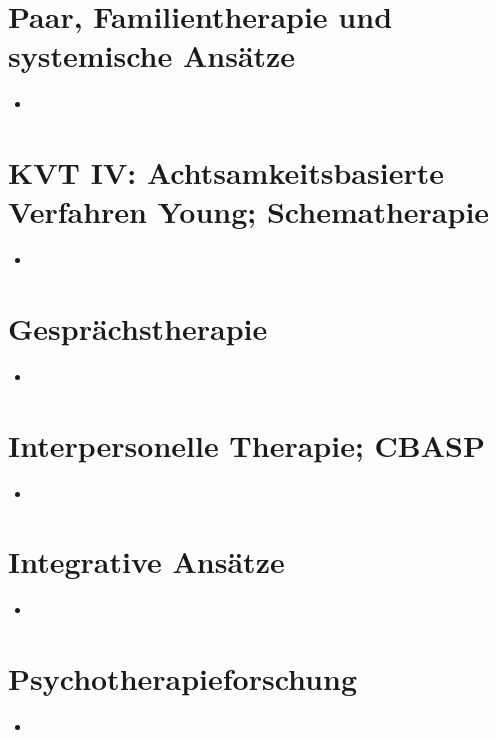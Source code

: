 \documentclass[11pt, paper=a4, twocolumn]{scrartcl}
\begin{document}
	\section{Paar, Familientherapie und systemische Ansätze}
		\begin{itemize}
			\item 
		\end{itemize}

	\section{KVT IV: Achtsamkeitsbasierte Verfahren Young; Schematherapie}
		\begin{itemize}
			\item 
		\end{itemize}

	\section{Gesprächstherapie}
		\begin{itemize}
			\item 
		\end{itemize}

	\section{Interpersonelle Therapie; CBASP}
		\begin{itemize}
			\item 
		\end{itemize}

	\section{Integrative Ansätze}
		\begin{itemize}
			\item 
		\end{itemize}

	\section{Psychotherapieforschung}
		\begin{itemize}
			\item 
		\end{itemize}
\end{document}
